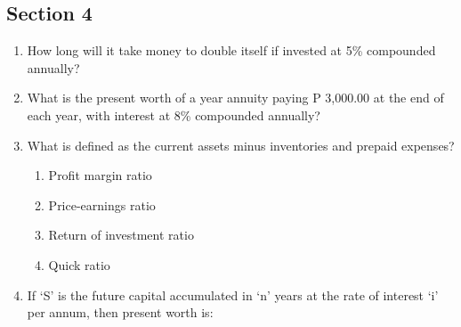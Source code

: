 \documentclass[11pt,a4paper]{article}
\begin{document}
\subsection*{Section 4}
\begin{enumerate}
\item{How long will it take money to double itself if invested at 5\% compounded annually?}
\\
\item{What is the present worth of a year annuity paying P 3,000.00 at the end of each year, with interest at 8\% compounded annually?}
\\
\item{What is defined as the current assets minus inventories and prepaid expenses?}
\begin{enumerate}[label=\Alph*.]
\item{Profit margin ratio}
\item{Price-earnings ratio}
\item{Return of investment ratio}
\item{Quick ratio}
\end{enumerate}
\item{If `S' is the future capital accumulated in `n' years at the rate of interest `i' per annum, then present worth is:
}
\\
\end{enumerate}
\end{document}
